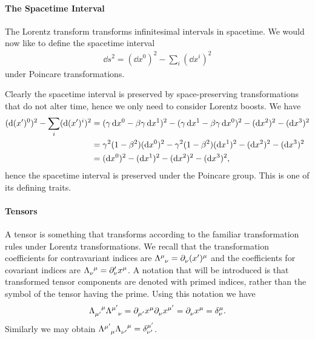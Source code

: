 \paragraph{The Spacetime Interval}
The Lorentz transform transforms infinitesimal intervals in spacetime. We would now like to define the spacetime interval
\begin{align*}
	\dd{s}^{2} = (\dd{x^{0}})^{2} - \sum\limits_{i}(\dd{x^{i}})^{2}
\end{align*}
under Poincare transformations.

Clearly the spacetime interval is preserved by space-preserving transformations that do not alter time, hence we only need to consider Lorentz boosts. We have
\begin{align*}
	(\dd{(x^{\prime})^{0}})^{2} - \sum\limits_{i}(\dd{(x^{\prime})^{i}})^{2} &= (\gamma\dd{x^{0}} - \beta\gamma\dd{x^{1}})^{2} - (\gamma\dd{x^{1}} - \beta\gamma\dd{x^{0}})^{2} - (\dd{x^{2}})^{2} - (\dd{x^{3}})^{2} \\
	                                                           &= \gamma^{2}(1 - \beta^{2})(\dd{x^{0}})^{2} - \gamma^{2}(1 - \beta^{2})(\dd{x^{1}})^{2} - (\dd{x^{2}})^{2} - (\dd{x^{3}})^{2} \\
	                                                           &= (\dd{x^{0}})^{2} - (\dd{x^{1}})^{2} - (\dd{x^{2}})^{2} - (\dd{x^{3}})^{2},
\end{align*}
hence the spacetime interval is preserved under the Poincare group. This is one of its defining traits.

\paragraph{Tensors}
A tensor is something that transforms according to the familiar transformation rules under Lorentz transformations. We recall that the transformation coefficients for contravariant indices are $\trcou{\mu}{\nu} = \del{\nu}{(x\p)^{\mu}}$ and the coefficients for covariant indices are $\trcod{\nu}{\mu} = \del[\prime]{\nu}{x^{\mu}}$. A notation that will be introduced is that transformed tensor components are denoted with primed indices, rather than the symbol of the tensor having the prime. Using this notation we have
\begin{align*}
	\trcod{\mu\p}{\mu}\trcou{\mu\p}{\nu} = \del{\mu\p}{x^{\mu}}\del{\nu}{x^{\mu\p}} = \del{\nu}{x^{\mu}} = \kdelta{\mu}{\nu}.
\end{align*}
Similarly we may obtain $\trcou{\mu\p}{\mu}\trcod{\nu\p}{\mu} = \kdelta{\mu\p}{\nu\p}$.


